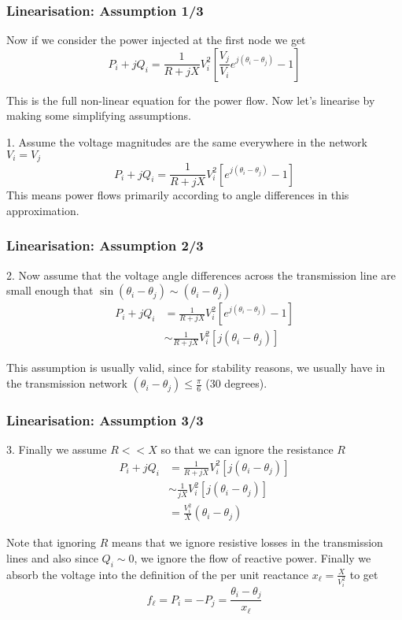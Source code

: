 \documentclass[10pt,aspectratio=169,dvipsnames]{beamer}
\begin{document}
\begin{frame}
  \frametitle{Linearisation: Assumption 1/3}

  Now if we consider the power injected at the first node we get
  \begin{equation*}
    P_i + jQ_i =  \frac{1}{R + jX} V_i^2\left[\frac{V_j}{V_i} e^{j(\theta_i - \theta_j)} - 1\right]
  \end{equation*}

  This is the full non-linear equation for the power flow. Now let's
  linearise by making some simplifying assumptions.

  1. Assume the voltage magnitudes are the same everywhere in the network $V_i = V_j$
  \begin{equation*}
    P_i + jQ_i =  \frac{1}{R + jX} V_i^2\left[e^{j(\theta_i - \theta_j)} - 1\right]
  \end{equation*}
  This means \alert{power flows primarily according to angle differences} in this approximation.


\end{frame}




\begin{frame}
  \frametitle{Linearisation: Assumption 2/3}


  2. Now assume that the voltage angle differences across the transmission line are small enough that $\sin(\theta_i - \theta_j) \sim (\theta_i - \theta_j)$
  \begin{align*}
    P_i + jQ_i & =  \frac{1}{R + jX} V_i^2\left[e^{j(\theta_i - \theta_j)} - 1\right] \\
    & \sim  \frac{1}{R + jX} V_i^2\left[j(\theta_i - \theta_j)\right]
  \end{align*}

  This assumption is usually valid, since for stability reasons, we usually have in the transmission network
  $(\theta_i - \theta_j) \leq \frac{\pi}{6}$ (30 degrees).
\end{frame}



\begin{frame}
  \frametitle{Linearisation: Assumption 3/3}


  3. Finally we assume $R << X$ so that we can ignore the resistance $R$
  \begin{align*}
    P_i + jQ_i
    & =  \frac{1}{R + jX} V_i^2\left[j(\theta_i - \theta_j)\right] \\
    & \sim  \frac{1}{jX} V_i^2\left[j(\theta_i - \theta_j)\right]\\
    & =  \frac{V_i^2}{X}(\theta_i - \theta_j)
  \end{align*}

  Note that ignoring $R$ means that we ignore resistive losses in the transmission lines and also since $Q_i \sim 0$, we ignore the flow of reactive power. Finally we absorb the voltage into the definition of the \alert{per unit} reactance $x_\ell = \frac{X}{V_i^2}$ to get
  \begin{equation*}
    f_\ell = P_i = -P_j = \frac{\theta_i - \theta_j}{x_\ell}
  \end{equation*}

\end{frame}
\end{document}

